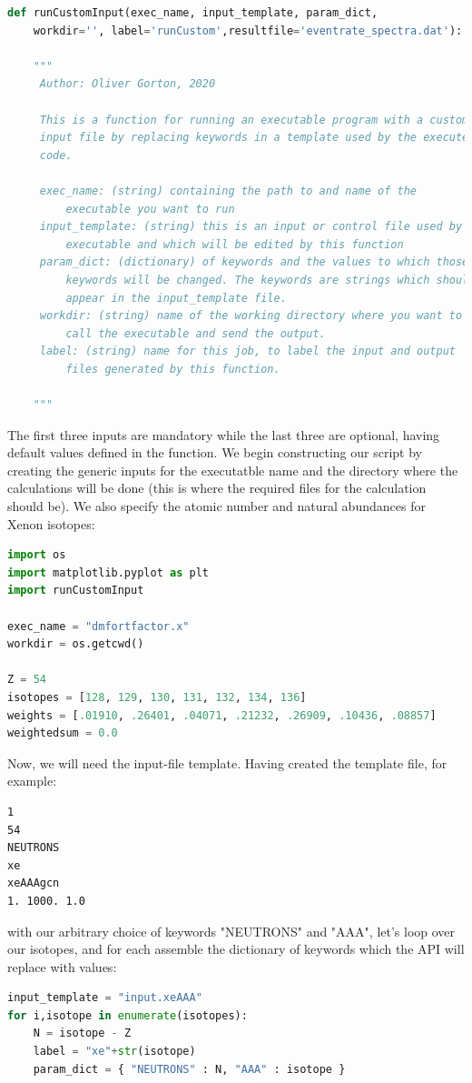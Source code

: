\documentclass[11pt]{article}
\begin{document}
\begin{lstlisting}[language=python]
def runCustomInput(exec_name, input_template, param_dict,
    workdir='', label='runCustom',resultfile='eventrate_spectra.dat'):

    """
     Author: Oliver Gorton, 2020

     This is a function for running an executable program with a custom
     input file by replacing keywords in a template used by the executed
     code.

     exec_name: (string) containing the path to and name of the
         executable you want to run
     input_template: (string) this is an input or control file used by the 
         executable and which will be edited by this function
     param_dict: (dictionary) of keywords and the values to which those 
         keywords will be changed. The keywords are strings which should 
         appear in the input_template file. 
     workdir: (string) name of the working directory where you want to 
         call the executable and send the output.
     label: (string) name for this job, to label the input and output 
         files generated by this function.

    """
\end{lstlisting}
The first three inputs are mandatory while the last three are optional, having
default values defined in the function.
We begin constructing our script by creating the generic inputs for the
executatble name and the directory where the calculations will be done (this is
where the required files for the calculation should be). We also specify the 
atomic number and natural abundances for Xenon isotopes:
\begin{lstlisting}[language=python]
import os
import matplotlib.pyplot as plt
import runCustomInput

exec_name = "dmfortfactor.x"
workdir = os.getcwd()

Z = 54
isotopes = [128, 129, 130, 131, 132, 134, 136]
weights = [.01910, .26401, .04071, .21232, .26909, .10436, .08857]
weightedsum = 0.0
\end{lstlisting}
Now, we will need the input-file template. Having created the template file, for
example:
\begin{verbatim}
1
54
NEUTRONS
xe
xeAAAgcn
1. 1000. 1.0
\end{verbatim}
with our arbitrary choice of keywords "NEUTRONS" and "AAA", 
let's loop over our isotopes, and for each assemble the dictionary of
keywords which the API will replace with values:
\begin{lstlisting}[language=python]
input_template = "input.xeAAA"
for i,isotope in enumerate(isotopes):
    N = isotope - Z
    label = "xe"+str(isotope)
    param_dict = { "NEUTRONS" : N, "AAA" : isotope }
\end{lstlisting}
\end{document}
